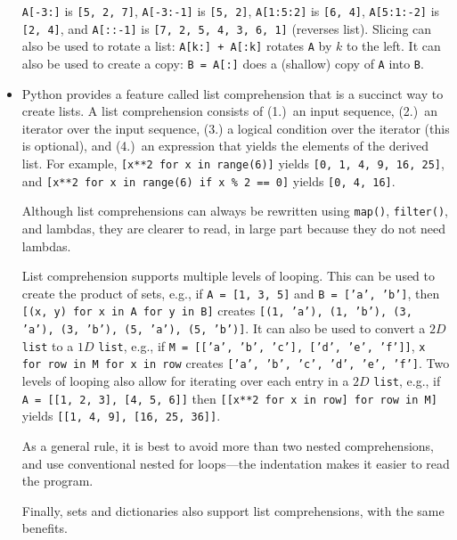\documentclass[10pt,openany,twoside,letterpaper,extrafontsizes]{memoir}
\begin{document}
\begin{Spacing}{\arraysSpacing}
\begin{itemize}
\texttt{A[-3:]} is \texttt{[5, 2, 7]},
\texttt{A[-3:-1]} is \texttt{[5, 2]},
\texttt{A[1:5:2]} is \texttt{[6, 4]},
\texttt{A[5:1:-2]} is \texttt{[2, 4]}, and
\texttt{A[::-1]} is \texttt{[7, 2, 5, 4, 3, 6, 1]} (reverses list).
Slicing can also be used to rotate a list: \texttt{A[k:] + A[:k]} rotates \texttt{A} by $k$ to the left.
It can also be used to create a copy: \texttt{B = A[:]} does a (shallow) copy of \texttt{A} into \texttt{B}.
\item Python provides a feature called list comprehension that is a succinct way to create lists.
A list comprehension consists of (1.)~an input sequence, (2.)~an iterator over the input sequence, (3.) a logical condition over the iterator (this is optional), and (4.)~an expression that yields the elements of the derived list.
For example, \texttt{[x**2 for x in range(6)]} yields \texttt{[0, 1, 4, 9, 16, 25]}, and \texttt{[x**2 for x in range(6) if x \% 2 == 0]} yields \texttt{[0, 4, 16]}.

Although list comprehensions can always be rewritten using \texttt{map()}, \texttt{filter()}, and lambdas, they are clearer to read, in large part because they do not need lambdas.

List comprehension supports multiple levels of looping.
This can be used to create the product of sets, e.g., if \texttt{A = [1, 3, 5]} and \texttt{B = ['a', 'b']}, then \texttt{[(x, y) for x in A for y in B]} creates \texttt{[(1, 'a'), (1, 'b'), (3, 'a'), (3, 'b'), (5, 'a'), (5, 'b')]}.
It can also be used to convert a $2D$ \texttt{list} to a $1D$ \texttt{list}, e.g., if \texttt{M = [['a', 'b', 'c'], ['d', 'e', 'f']]}, \texttt{x for row in M for x in row} creates \texttt{['a', 'b', 'c', 'd', 'e', 'f']}.
Two levels of looping also allow for iterating over each entry in a $2D$ \texttt{list}, e.g., if \texttt{A = [[1, 2, 3], [4, 5, 6]]} then \texttt{[[x**2 for x in row] for row in M]} yields \texttt{[[1, 4, 9], [16, 25, 36]]}.

As a general rule, it is best to avoid more than two nested comprehensions, and use conventional nested for loops---the indentation makes it easier to read the program.

Finally, sets and dictionaries also support list comprehensions, with the same benefits.
\end{itemize}



\end{Spacing}
\end{document}
